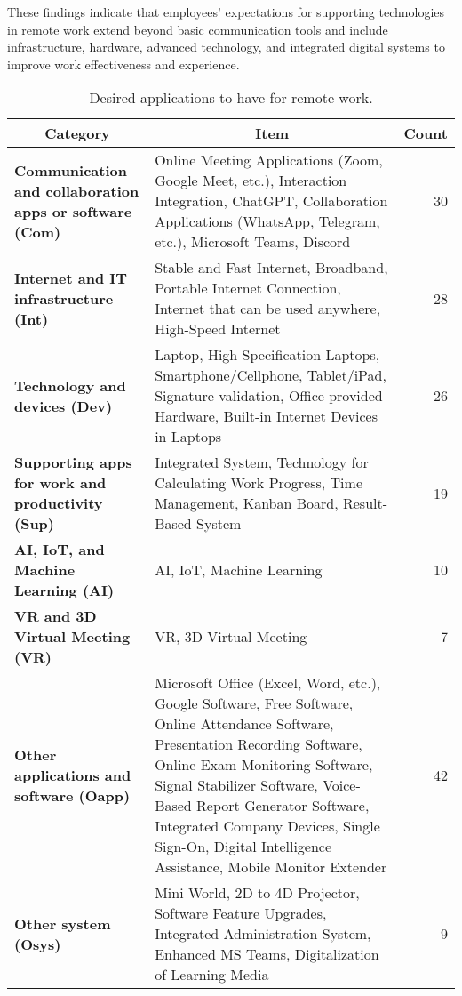 \documentclass[a4paper, conference]{IEEEtran}
\begin{document}
These findings indicate that employees’ expectations for supporting technologies in remote work extend beyond basic communication tools and include infrastructure, hardware, advanced technology, and integrated digital systems to improve work effectiveness and experience.

\begin{table*}
	\centering
	\caption{Desired applications to have for remote work.}
	\label{tab:required_apps_for_remote_work}
	\begin{tabular}{|p{}|p{}|r|}
		\hline
		\multicolumn{1}{|c|}{\textbf{Category}}                                   & \multicolumn{1}{c|}{\textbf{Item}}                                                                                                                                                                                   & \multicolumn{1}{c|}{\textbf{Count}} \\ \hline
		\textbf{Communication  and  collaboration apps or software (Com)} & Online Meeting Applications (Zoom, Google Meet, etc.), Interaction Integration, ChatGPT, Collaboration Applications (WhatsApp, Telegram, etc.), Microsoft Teams, Discord                                                                                     & 30 %
		\\ \hline
		\textbf{Internet and IT infrastructure (Int)} & Stable and Fast Internet, Broadband, Portable Internet Connection, Internet that can be used anywhere, High-Speed Internet & 28 %
		\\ \hline
		\textbf{Technology and devices (Dev)} & Laptop, High-Specification Laptops, Smartphone/Cellphone, Tablet/iPad, Signature validation, Office-provided Hardware, Built-in Internet Devices in Laptops                                                                                                                          & 26 %
		\\ \hline
		\textbf{Supporting apps for work and productivity (Sup)} & Integrated System, Technology for Calculating Work Progress, Time Management, Kanban Board, Result-Based System & 19 %
		\\ \hline
		\textbf{AI, IoT, and  Machine  Learning (AI)} & AI, IoT, Machine Learning
		& 10 %
		\\ \hline
		\textbf{VR and 3D  Virtual Meeting (VR)} & VR, 3D Virtual Meeting & 7%
		\\ \hline
		\textbf{Other applications and software (Oapp)} & Microsoft Office (Excel, Word, etc.), Google Software, Free Software, Online Attendance Software, Presentation Recording Software, Online Exam Monitoring Software, Signal Stabilizer Software, Voice-Based Report Generator Software, Integrated Company Devices, Single Sign-On, Digital Intelligence Assistance, Mobile Monitor Extender & 42 %
		\\ \hline
		\textbf{Other system (Osys)} & Mini World, 2D to 4D Projector, Software Feature Upgrades, Integrated Administration System, Enhanced MS Teams, Digitalization of Learning Media & 9 %
		\\ \hline
	\end{tabular}
\end{table*}
\end{document}
